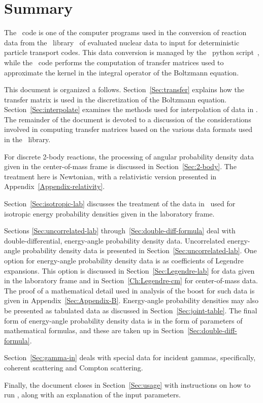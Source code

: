 \chapter{Summary}
The \gettransfer\ code is one of the computer programs
used in the conversion of reaction
data from the \xendl\ library~\cite{GND} of evaluated nuclear data
to input for
deterministic particle transport codes.  This data conversion
is managed by the \xndfgen\ python script~\cite{xndfgen}, while the
\gettransfer\ code performs the computation of transfer
matrices used to approximate
the kernel in the integral operator of the Boltzmann
equation.

This document is organized a follows.  Section~\ref{Sec:transfer} explains how the
transfer matrix is used in the discretization of the Boltzmann
equation.  Section~\ref{Sec:interpolate} examines the methods used for interpolation
of data in \xendl.  The remainder of the document is devoted to
a discussion of the considerations involved in computing 
transfer matrices based on the various data formats used in the \xendl\ library.

For discrete 2-body reactions, the processing of angular probability
density data given in the center-of-mass frame is discussed in
Section~\ref{Sec:2-body}.  The treatment here is Newtonian, with a relativistic
version presented in Appendix~\ref{Appendix-relativity}.

Section~\ref{Sec:isotropic-lab} discusses the treatment of the data in \xendl\ used for
isotropic energy probability densities given in the laboratory frame.

Sections \ref{Sec:uncorrelated-lab} through~\ref{Sec:double-diff-formula}
deal with double-differential, energy-angle
probability density data.  Uncorrelated energy-angle probability
density data is presented in Section~\ref{Sec:uncorrelated-lab}.  
One option for energy-angle probability
density data is  as coefficients of Legendre expansions.
This option is discussed in Section~\ref{Sec:Legendre-lab} for data given in the laboratory frame
and in Section~\ref{Ch:Legendre-cm} for center-of-mass data.  The proof of a mathematical
detail used in analysis of the boost for such data is given in Appendix~\ref{Sec:Appendix-B}.
Energy-angle probability densities may also be presented as
tabulated data as discussed in Section~\ref{Sec:joint-table}.  The final form of
energy-angle probability density data is in the form of parameters
of mathematical formulas, and these are taken up in Section~\ref{Sec:double-diff-formula}.

Section~\ref{Sec:gamma-in} deals with special data for incident gammas,
specifically, coherent scattering and Compton scattering.

Finally, the document closes in Section~\ref{Sec:usage} with instructions on how to run
\gettransfer, along with an explanation of the input parameters.
